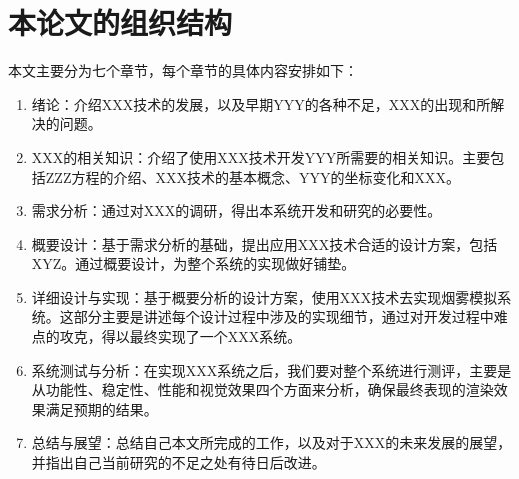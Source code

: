 \section{本论文的组织结构}
本文主要分为七个章节，每个章节的具体内容安排如下：
\begin{enumerate}
\item 绪论：介绍XXX技术的发展，以及早期YYY的各种不足，XXX的出现和所解决的问题。
\item XXX的相关知识：介绍了使用XXX技术开发YYY所需要的相关知识。主要包括ZZZ方程的介绍、XXX技术的基本概念、YYY的坐标变化和XXX。
\item 需求分析：通过对XXX的调研，得出本系统开发和研究的必要性。
\item 概要设计：基于需求分析的基础，提出应用XXX技术合适的设计方案，包括XYZ。通过概要设计，为整个系统的实现做好铺垫。
\item 详细设计与实现：基于概要分析的设计方案，使用XXX技术去实现烟雾模拟系统。这部分主要是讲述每个设计过程中涉及的实现细节，通过对开发过程中难点的攻克，得以最终实现了一个XXX系统。
\item 系统测试与分析：在实现XXX系统之后，我们要对整个系统进行测评，主要是从功能性、稳定性、性能和视觉效果四个方面来分析，确保最终表现的渲染效果满足预期的结果。
\item 总结与展望：总结自己本文所完成的工作，以及对于XXX的未来发展的展望，并指出自己当前研究的不足之处有待日后改进。
\end{enumerate}



\makeatletter
\@openrightfalse
\makeatother